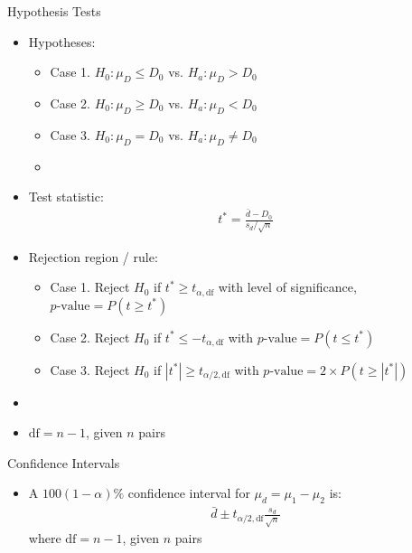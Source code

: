 \documentclass[xcolor=dvipsnames]{beamer}
\begin{document}
\begin{frame}{Hypothesis Tests}
\begin{itemize}
	\item Hypotheses: \pause
	\begin{itemize}
		\item Case 1. $H_0: \mu_D \leq D_0$ vs. $H_a: \mu_D > D_0$ \pause
		\item Case 2. $H_0: \mu_D \geq D_0$ vs. $H_a: \mu_D < D_0$ \pause
		\item Case 3. $H_0: \mu_D = D_0$ vs. $H_a: \mu_D \neq D_0$ \pause
		\item[]
	\end{itemize}
	\item Test statistic:
	\begin{align*}
	t^* = \frac{\bar{d}-D_0}{s_d / \sqrt{n}}
	\end{align*}\pause
	\item Rejection region / rule:
	\begin{itemize}
		\item Case 1. Reject $H_0$ if $t^* \geq t_{\alpha, \text{df}}$ with level of significance, $p\text{-value}=P(t \geq t^*)$ \pause
		\item Case 2. Reject $H_0$ if $t^* \leq -t_{\alpha, \text{df} }$ with $p\text{-value}=P(t \leq t^*)$ \pause
		\item Case 3. Reject $H_0$ if $|t^*| \geq t_{\alpha / 2, \text{df}}$ with $p\text{-value}=2 \times P(t \geq |t^*|)$ \pause
	\end{itemize}
\item[]
\item $\text{df}= n-1$, given $n$ pairs
\end{itemize}
\end{frame}

\begin{frame}{Confidence Intervals}
	\begin{itemize}
		\item A $100(1-\alpha)\%$ confidence interval for $\mu_d = \mu_1 - \mu_2$ is: \pause
		\begin{gather*}
		\bar{d} \pm t_{\alpha / 2, \text{df}}\frac{s_d}{\sqrt{n}}
		\end{gather*}
		where $\text{df}= n-1$, given $n$ pairs
	\end{itemize}
\end{frame}
\end{document}
